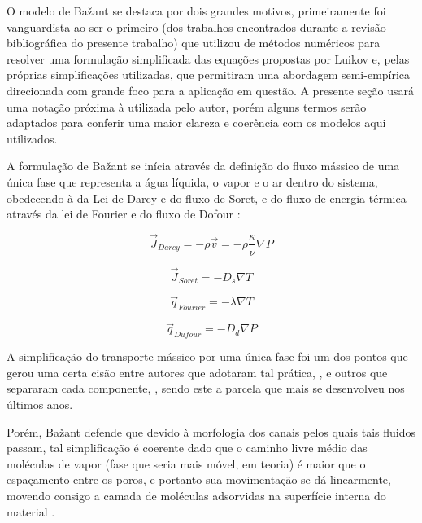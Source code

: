 O modelo de Ba\v{z}ant se destaca por dois grandes motivos, primeiramente foi
vanguardista ao ser o primeiro (dos trabalhos encontrados durante a revisão
bibliográfica do presente trabalho) que utilizou de métodos numéricos para
resolver uma formulação simplificada das equações propostas por Luikov e, pelas
próprias simplificações utilizadas, que permitiram uma abordagem semi-empírica
direcionada com grande foco para a aplicação em questão. A presente seção usará
uma notação próxima à utilizada pelo autor, porém alguns termos serão adaptados
para conferir uma maior clareza e coerência com os modelos aqui utilizados.

A formulação de Ba\v{z}ant se inícia através da definição do fluxo mássico de
uma única fase que representa a água líquida, o vapor e o ar dentro do sistema,
obedecendo à da Lei de Darcy e do fluxo de Soret, e do fluxo de energia térmica
através da lei de Fourier e do fluxo de Dofour \cite{bazant1978thermal,
  bazant1978, bavzant1982, bazant1979}:

\begin{equation}
  \label{eq:Darcy}
  \vec{J}_{Darcy} = - \rho \vec{v} = - \rho \frac{\kappa }{\nu} \nabla P 
\end{equation}

\begin{equation}
  \label{eq:Soret}
  \vec{J}_{Soret} = - D_s \nabla T
\end{equation}

\begin{equation}
  \label{eq:Fourier}
  \vec{q}_{Fourier} = - \lambda \nabla T 
\end{equation}

\begin{equation}
  \label{eq:Dufour}
  \vec{q}_{Dufour} = - D_d \nabla P
\end{equation}

A simplificação do transporte mássico por uma única fase foi um dos pontos que
gerou uma certa cisão entre autores que adotaram tal prática, \cite{Gong1995a,
  Gong1991, Abdel-Rahman1996}, e outros que separaram cada componente,
\cite{Pesavento2013, Gawin2003, Gawin2004, Gawin1999, Fey2016b, Davie2006a,
  Davie2012a}, sendo este a parcela que mais se desenvolveu nos últimos anos.

Porém, Ba\v{z}ant defende que devido à morfologia dos canais pelos quais tais
fluidos passam, tal simplificação é coerente dado que o caminho livre médio das
moléculas de vapor (fase que seria mais móvel, em teoria) é maior que o
espaçamento entre os poros, e portanto sua movimentação se dá linearmente,
movendo consigo a camada de moléculas adsorvidas na superfície interna do
material \cite{bavzant2018creep}.

